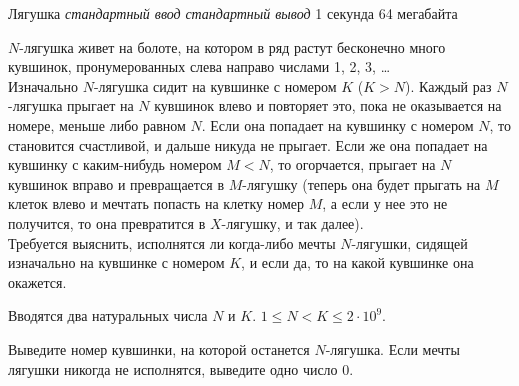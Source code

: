 \begin{problem}%
{Лягушка}%
{\textsl{стандартный ввод}}%
{\textsl{стандартный вывод}}%
{1 секунда}%
{64 мегабайта}{}

$N$-лягушка живет на болоте, на котором в ряд растут бесконечно много кувшинок, пронумерованных слева направо числами 1, 2, 3, \dots\\

Изначально $N$-лягушка сидит на кувшинке с номером $K$ ($K > N$). Каждый раз $N$-лягушка прыгает на $N$ кувшинок влево и повторяет это, пока не оказывается на номере, меньше либо равном $N$. Если она попадает на кувшинку с номером $N$, то становится счастливой, и дальше никуда не прыгает. Если же она попадает на кувшинку с каким-нибудь номером $M < N$, то огорчается, прыгает на $N$ кувшинок вправо и превращается в $M$-лягушку (теперь она будет прыгать на $M$ клеток влево и мечтать попасть на клетку номер $M$, а если у нее это не получится, то она превратится в $X$-лягушку, и так далее).\\

Требуется выяснить, исполнятся ли когда-либо мечты $N$-лягушки, сидящей изначально на кувшинке с номером $K$, и если да, то на какой кувшинке она окажется.

\InputFile

Вводятся два натуральных числа $N$ и $K$. $1 \le N < K \le 2 \cdot 10^9$.

\OutputFile

Выведите номер кувшинки, на которой останется $N$-лягушка. Если мечты лягушки никогда не исполнятся, выведите одно число 0.

\Examples

\begin{example}
%
\end{example}
\end{problem}